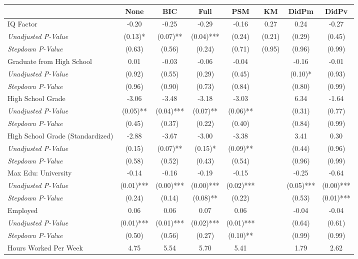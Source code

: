 \begin{tabular}{l c c c c c c c}
\toprule
 & None & BIC & Full & PSM & KM & DidPm & DidPv \\
\midrule
IQ Factor & -0.20 & -0.25 & -0.29 & -0.16 & 0.27 & 0.24 & -0.27 \\
\quad \textit{Unadjusted P-Value} & (0.13)* & (0.07)** & (0.04)*** & (0.24) & (0.21) & (0.29) & (0.45) \\
\quad \textit{Stepdown P-Value} & (0.63) & (0.56) & (0.24) & (0.71) & (0.95) & (0.96) & (0.99) \\
Graduate from High School & 0.01 & -0.03 & -0.06 & -0.04 & & -0.16 & -0.01 \\
\quad \textit{Unadjusted P-Value} & (0.92) & (0.55) & (0.29) & (0.45) & & (0.10)* & (0.93) \\
\quad \textit{Stepdown P-Value} & (0.96) & (0.90) & (0.73) & (0.84) & & (0.80) & (0.99) \\
High School Grade & -3.06 & -3.48 & -3.18 & -3.03 & & 6.34 & -1.64 \\
\quad \textit{Unadjusted P-Value} & (0.05)** & (0.04)*** & (0.07)** & (0.06)** & & (0.31) & (0.77) \\
\quad \textit{Stepdown P-Value} & (0.45) & (0.37) & (0.22) & (0.40) & & (0.84) & (0.99) \\
High School Grade (Standardized) & -2.88 & -3.67 & -3.00 & -3.38 & & 3.41 & 0.30 \\
\quad \textit{Unadjusted P-Value} & (0.15) & (0.07)** & (0.15)* & (0.09)** & & (0.44) & (0.96) \\
\quad \textit{Stepdown P-Value} & (0.58) & (0.52) & (0.43) & (0.54) & & (0.96) & (0.99) \\
Max Edu: University & -0.14 & -0.16 & -0.19 & -0.15 & & -0.25 & -0.64 \\
\quad \textit{Unadjusted P-Value} & (0.01)*** & (0.00)*** & (0.00)*** & (0.02)*** & & (0.05)*** & (0.00)*** \\
\quad \textit{Stepdown P-Value} & (0.24) & (0.14) & (0.08)** & (0.22) & & (0.53) & (0.01)*** \\
Employed & 0.06 & 0.06 & 0.07 & 0.06 & & -0.04 & -0.04 \\
\quad \textit{Unadjusted P-Value} & (0.01)*** & (0.01)*** & (0.02)*** & (0.01)*** & & (0.64) & (0.61) \\
\quad \textit{Stepdown P-Value} & (0.50) & (0.56) & (0.27) & (0.10)** & & (0.99) & (0.99) \\
Hours Worked Per Week & 4.75 & 5.54 & 5.70 & 5.41 & & 1.79 & 2.62 \\

\end{tabular}
